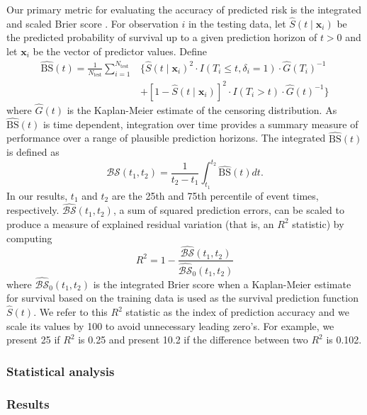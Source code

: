 \documentclass[twoside,11pt]{article}\usepackage[]{graphicx}\usepackage[]{color}
\newcommand{\ie}{that is}
\newcommand{\bstat}{\widehat{\text{BS}}(t)}
\newcommand{\bsbar}{\mathcal{\widehat{BS}}(t_1, t_2)}
\newcommand{\bskap}{\mathcal{\widehat{BS}}_0(t_1, t_2)}
\newcommand{\ntest}{N_{\text{test}}}
\begin{document}
Our primary metric for evaluating the accuracy of predicted risk is the integrated and scaled Brier score \citep{graf1999assessment}. For observation $i$ in the testing data, let $\widehat{S}(t \mid \bm{x}_i)$ be the predicted probability of survival up to a given prediction horizon of $t > 0$ and let $\bm{x}_i$ be the vector of predictor values. Define \begin{align*}
\bstat = \frac{1}{\ntest} \sum_{i=1}^{\ntest} &\{ \widehat{S}(t \mid \bm{x}_i)^2 \cdot I(T_i \leq t, \delta_i = 1) \cdot \widehat{G}(T_i)^{-1} \\ &+ [1-\widehat{S}(t \mid \bm{x}_i)]^2 \cdot I(T_i > t) \cdot \widehat{G}(t)^{-1}\}
\end{align*} where $\widehat{G}(t)$ is the Kaplan-Meier estimate of the censoring distribution. As $\bstat$ is time dependent, integration over time provides a summary measure of performance over a range of plausible prediction horizons. The integrated $\bstat$ is defined as \begin{equation}
\bsbar = \frac{1}{t_2 - t_1}\int_{t_1}^{t_2} \widehat{\text{BS}}(t) dt.
\end{equation} In our results, $t_1$ and $t_2$ are the 25th and 75th percentile of event times, respectively. $\bsbar$, a sum of squared prediction errors, can be scaled to produce a measure of explained residual variation (\ie, an $R^2$ statistic) by computing \begin{equation}
R^2 = 1 - \frac{\bsbar}{\bskap}
\end{equation} where $\bskap$ is the integrated Brier score when a Kaplan-Meier estimate for survival based on the training data is used as the survival prediction function $\widehat{S}(t)$. We refer to this $R^2$ statistic as the index of prediction accuracy and we scale its values by 100 to avoid unnecessary leading zero's. For example, we present 25 if $R^2$ is 0.25 and present 10.2 if the difference between two $R^2$ is 0.102.

\subsubsection{Statistical analysis}

\subsubsection{Results}
\end{document}
